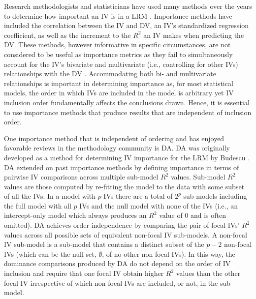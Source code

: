 \documentclass[man]{apa7}
\begin{document}
	Research methodologists and statisticians have used many methods over the years to determine how important an IV is in a LRM \parencite[see reviews in][]{gromping2007estimators, johnson2004history}.
	Importance methods have included the correlation between the IV and DV, an IV's standardized regression coefficient, as well as the increment to the $R^2$ an IV makes when predicting the DV.
	These methods, however informative in specific circumstances, are not considered to be useful as importance metrics as they fail to simultaneously account for the IV's bivariate and multivariate (i.e., controlling for other IVs) relationships with the DV \parencite{johnson2004history}.
	Accommodating both bi- and multivariate relationships is important in determining importance as, for most statistical models, the order in which IVs are included in the model is arbitrary yet IV inclusion order fundamentally affects the conclusions drawn.
	Hence, it is essential to use importance methods that produce results that are independent of inclusion order.
	
	One importance method that is independent of ordering and has enjoyed favorable reviews in the methodology community is DA.
	DA was originally developed as a method for determining IV importance for the LRM by Budescu \parencite*{budescu1993dominance}.
	DA extended on past importance methods by defining importance in terms of pairwise IV comparisons across multiple sub-model $R^2$ values.
	Sub-model $R^2$ values are those computed by re-fitting the model to the data with some subset of all the IVs.
	In a model with $p$ IVs there are a total of $2^p$ sub-models including the full model with all $p$ IVs and the null model with none of the IVs (i.e., an intercept-only model which always produces an $R^2$ value of 0 and is often omitted).
	DA achieves order independence by comparing the pair of focal IVs' $R^2$ values across all possible sets of equivalent non-focal IV sub-models. 
	A non-focal IV sub-model is a sub-model that contains a distinct subset of the $p - 2$ non-focal IVs (which can be the null set, $\emptyset$, of no other non-focal IVs).	
	In this way, the dominance comparisons produced by DA do not depend on the order of IV inclusion and require that one focal IV obtain higher $R^2$ values than the other focal IV irrespective of which non-focal IVs are included, or not, in the sub-model.
	
\end{document}
